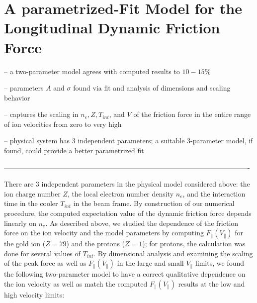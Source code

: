 \documentclass[12pt, reqno]{amsart}
\begin{document}
\section{A parametrized-Fit Model for the Longitudinal Dynamic Friction Force}

-- a two-parameter model agrees with computed results to $10-15\%$ 

-- parameters $A$ and $\sigma$ found via fit and analysis of dimensions and scaling behavior 

-- captures the scaling in $n_e, Z, T_{int}$, and $V$ of the friction force in the entire range of ion velocities from zero to very high 

-- physical system has 3 independent parameters; a suitable 3-parameter model, if found, could provide a better parametrized fit  

---------------------------------------------------------------------------------------------------------- 

There are 3 independent parameters in the physical model considered above: the ion charge number $Z$, the local electron number density $n_e$, and the interaction time in the cooler $T_{int}$ in the beam frame.  By construction of our numerical procedure, the computed expectation value of the dynamic friction force depends linearly on $n_e$.  As described above, we studied the dependence of the friction force on the ion velocity and the model parameters by computing $F_{\parallel}(V_{\parallel})$ for the gold ion ($Z = 79$) and the protons ($Z = 1$); for protons, the calculation was done for several values of $T_{int}$.  By dimensional analysis and examining the scaling of the peak force as well as $F_{\parallel}(V_{\parallel})$ in the large and small $V_{\parallel}$ limits, we found the following two-parameter model to have a correct qualitative dependence on the ion velocity as well as match the computed $F_{\parallel}(V_{\parallel})$ results at the low and high velocity limits:
\end{document}
